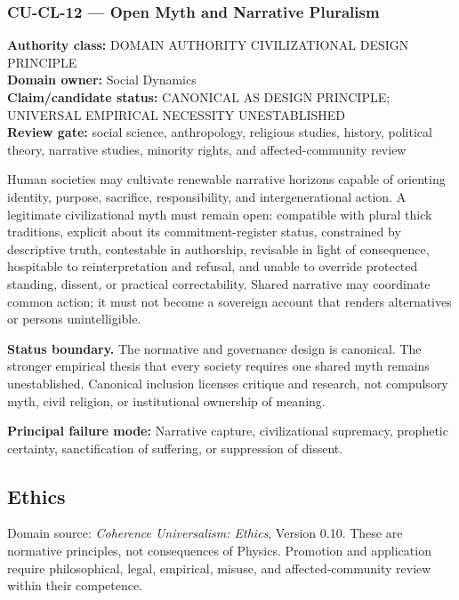 \documentclass[
  11pt,
]{article}
\begin{document}
\subsubsection{CU-CL-12 --- Open Myth and Narrative
Pluralism}\label{cu-cl-12-open-myth-and-narrative-pluralism}

\textbf{Authority class:} DOMAIN AUTHORITY CIVILIZATIONAL DESIGN
PRINCIPLE\\
\textbf{Domain owner:} Social Dynamics\\
\textbf{Claim/candidate status:} CANONICAL AS DESIGN PRINCIPLE;
UNIVERSAL EMPIRICAL NECESSITY UNESTABLISHED\\
\textbf{Review gate:} social science, anthropology, religious studies,
history, political theory, narrative studies, minority rights, and
affected-community review

Human societies may cultivate renewable narrative horizons capable of
orienting identity, purpose, sacrifice, responsibility, and
intergenerational action. A legitimate civilizational myth must remain
open: compatible with plural thick traditions, explicit about its
commitment-register status, constrained by descriptive truth,
contestable in authorship, revisable in light of consequence, hospitable
to reinterpretation and refusal, and unable to override protected
standing, dissent, or practical correctability. Shared narrative may
coordinate common action; it must not become a sovereign account that
renders alternatives or persons unintelligible.

\textbf{Status boundary.} The normative and governance design is
canonical. The stronger empirical thesis that every society requires one
shared myth remains unestablished. Canonical inclusion licenses critique
and research, not compulsory myth, civil religion, or institutional
ownership of meaning.

\textbf{Principal failure mode:} Narrative capture, civilizational
supremacy, prophetic certainty, sanctification of suffering, or
suppression of dissent.

\subsection{Ethics}\label{ethics}

Domain source: \emph{Coherence Universalism: Ethics}, Version 0.10.
These are normative principles, not consequences of Physics. Promotion
and application require philosophical, legal, empirical, misuse, and
affected-community review within their competence.
\end{document}
